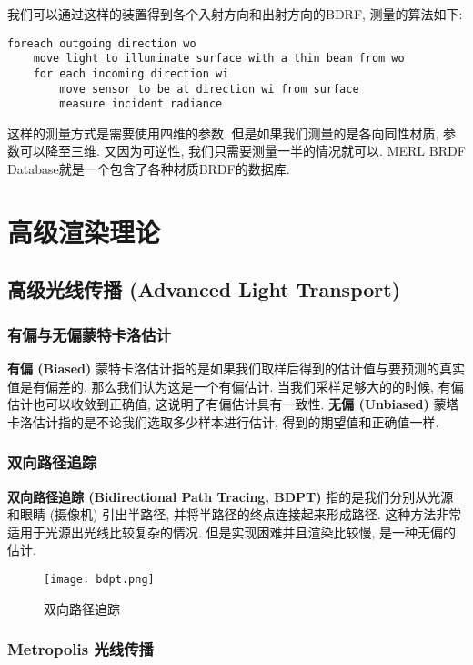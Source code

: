 我们可以通过这样的装置得到各个入射方向和出射方向的BDRF, 测量的算法如下: 
\begin{lstlisting}[caption=BDRF的测量]
foreach outgoing direction wo
	move light to illuminate surface with a thin beam from wo
	for each incoming direction wi
		move sensor to be at direction wi from surface
		measure incident radiance
\end{lstlisting}

这样的测量方式是需要使用四维的参数. 但是如果我们测量的是各向同性材质, 参数可以降至三维. 又因为可逆性, 我们只需要测量一半的情况就可以. MERL BRDF Database就是一个包含了各种材质BRDF的数据库. 

\chapter{高级渲染理论}

\section{高级光线传播 (Advanced Light Transport) }

\subsection{有偏与无偏蒙特卡洛估计}

\textbf{有偏 (Biased) }蒙特卡洛估计指的是如果我们取样后得到的估计值与要预测的真实值是有偏差的, 那么我们认为这是一个有偏估计. 当我们采样足够大的的时候, 有偏估计也可以收敛到正确值, 这说明了有偏估计具有一致性. \textbf{无偏 (Unbiased) }蒙塔卡洛估计指的是不论我们选取多少样本进行估计, 得到的期望值和正确值一样. 

\subsection{双向路径追踪}

\textbf{双向路径追踪 (Bidirectional Path Tracing, BDPT) }指的是我们分别从光源和眼睛 (摄像机) 引出半路径, 并将半路径的终点连接起来形成路径. 这种方法非常适用于光源出光线比较复杂的情况. 但是实现困难并且渲染比较慢, 是一种无偏的估计. 

\begin{figure}[H]
	\centering
	\texttt{[image: bdpt.png]}
	\caption{双向路径追踪}
	\label{fig:bdpt}
\end{figure}

\subsection{Metropolis 光线传播}

